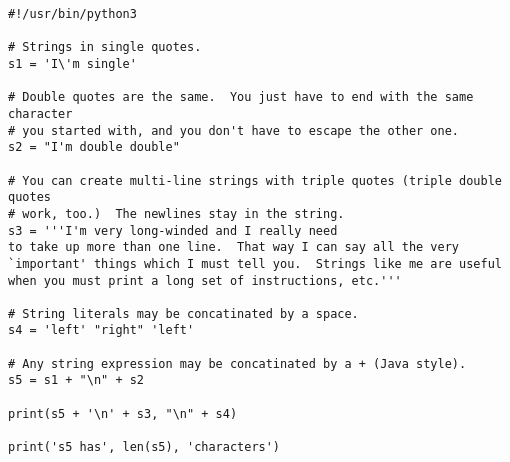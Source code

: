 \begin{verbatim}
#!/usr/bin/python3

# Strings in single quotes.
s1 = 'I\'m single'

# Double quotes are the same.  You just have to end with the same character
# you started with, and you don't have to escape the other one.
s2 = "I'm double double"

# You can create multi-line strings with triple quotes (triple double quotes
# work, too.)  The newlines stay in the string.
s3 = '''I'm very long-winded and I really need
to take up more than one line.  That way I can say all the very
`important' things which I must tell you.  Strings like me are useful
when you must print a long set of instructions, etc.'''

# String literals may be concatinated by a space.
s4 = 'left' "right" 'left'

# Any string expression may be concatinated by a + (Java style).
s5 = s1 + "\n" + s2

print(s5 + '\n' + s3, "\n" + s4)

print('s5 has', len(s5), 'characters')
\end{verbatim}
